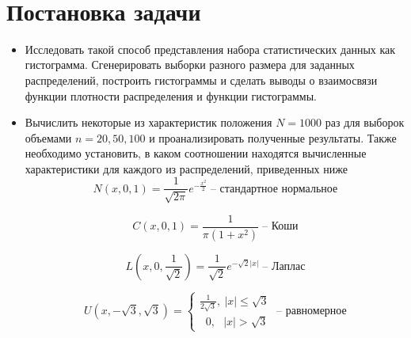 \documentclass[12pt]{article}
\begin{document}



\tableofcontents
{}
\vfill ~
\setcounter{section}{0}



\newpage 
\section*{Постановка задачи}

\begin{itemize}
	\item Исследовать такой способ представления набора статистических данных как гистограмма. Сгенерировать выборки разного размера для заданных распределений, построить гистограммы и сделать выводы о взаимосвязи функции плотности распределения и функции гистограммы.
	\item{Вычислить некоторые из характеристик положения $N = 1000$ раз для выборок объемами $n = 20, 50, 100$ и проанализировать полученные результаты. Также необходимо установить, в каком соотношении находятся вычисленные характеристики для каждого из распределений, приведенных ниже
	\begin{equation}
		\label{dist:1}
		N(x, 0, 1) = \frac{1}{\sqrt{2\pi}}e^{-\frac{x^2}{2}} \;\text{-- стандартное нормальное}
	\end{equation}
	 
	\begin{equation}
		C(x, 0, 1) = \frac{1}{\pi(1 + x^2)} \;\text{-- Коши} \label{dist:2}
	\end{equation}

	\begin{equation}
		L(x, 0, \frac{1}{\sqrt{2}}) = \frac{1}{\sqrt{2}}e^{{-\sqrt{2}|x|}} \;\text{-- Лаплас} \label{dist:3}
	\end{equation}

	\begin{equation} 
		U(x, -\sqrt{3}, \sqrt{3}) = 
	    \begin{cases}
	        \frac{1}{2\sqrt{3}}, \: |x| \leq \sqrt{3}\\
	        \;\; 0, \:\:\:|x| > \sqrt{3}
	    \end{cases}
	    \;\text{-- равномерное} \label{dist:4}
	\end{equation}

}
\end{itemize}
\end{document}
